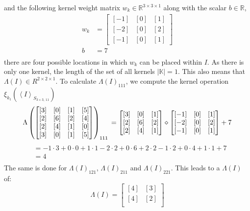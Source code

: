 \documentclass[12pt]{article}
\begin{document}
and the following kernel weight matrix \(w_k \in \mathbb{R}^{3 \times 3 \times 1}\) along with the scalar \(b\in \mathbb{R}\),
\begin{align*}
w_k &= \left[
\begin{matrix}
[-1] & [0] & [1] \\ 
[-2] & [0] & [2] \\
[-1] & [0] & [1]
\end{matrix}
\right]\\
b &=7\\
\end{align*}
there are four possible locations in which \(w_k\) can be placed within \(I\). As there is only one kernel, the length of the set of all kernels \(|\mathbb{K}| = 1\). This also means that \(\Lambda(I) \in R^{2 \times 2 \times 1}\). To calculate \(\Lambda(I)_{111}\), we compute the kernel operation \(\xi_{k_1}(\left<I\right>_{S_{3\times 3,\,11}})\)
\begin{equation}
\label{eq:conv:eg}
\Lambda
\left(\begin{bmatrix}
[3] & [0] & [1] & [5] \\
[2] & [6] & [2] & [4] \\
[2] & [4] & [1] & [0] \\
[3] & [0] & [1] & [5] \\
\end{bmatrix}\right)_{111}\\
 = \begin{bmatrix}
[3] & [0] & [1] \\
[2] & [6] & [2] \\
[2] & [4] & [1] \\
\end{bmatrix}\diamond
\begin{bmatrix}
[-1] & [0] & [1] \\
[-2] & [0] & [2] \\
[-1] & [0] & [1]
\end{bmatrix} + 7
\end{equation}
\begin{align*}
&= -1 \cdot 3 + 0 \cdot 0 + 1 \cdot 1 - 2 \cdot 2 + 0 \cdot 6 + 2 \cdot 2 -1 \cdot 2 + 0 \cdot 4 + 1 \cdot 1 + 7\\
&= 4\\
\end{align*}
The same is done for \(\Lambda(I)_{121}\), \(\Lambda(I)_{211}\) and \(\Lambda(I)_{221}\). This leads to a \(\Lambda(I)\) of:
\[
\Lambda(I) = \begin{bmatrix}
[4] & [3] \\
[4] & [2] \\
\end{bmatrix}
\]
\end{document}

